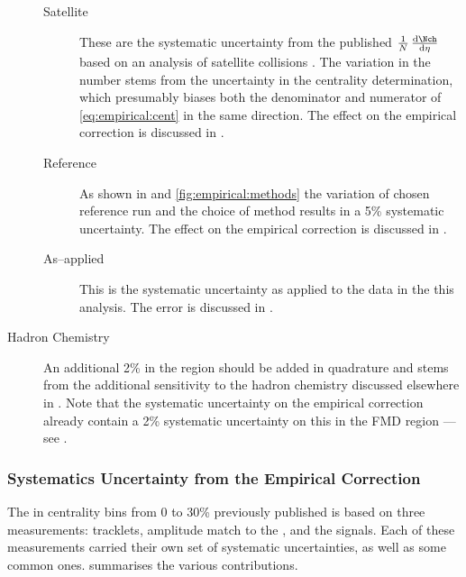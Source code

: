\begin{description}
  \begin{description}
  \item[Satellite] These are the systematic uncertainty from the
    published $\ndndeta$ based on an analysis of satellite collisions
    \cite{Abbas:2013bpa}.  The variation in the number stems from the
    uncertainty in the centrality determination, which presumably
    biases both the denominator and numerator of
    \eqref{eq:empirical:cent} in the same direction. The effect on the
    empirical correction is discussed in .
  \item[Reference] As shown in  and
    \ref{fig:empirical:methods} the variation of chosen reference run
    and the choice of method results in a 5\% systematic
    uncertainty. The effect on the empirical correction is discussed
    in .
  \item[As--applied] This is the systematic uncertainty as applied to
    the data in the this analysis. The error is discussed in
    .
  \end{description}
\item[Hadron Chemistry] An additional 2\% in the  region should
  be added in quadrature and stems from the additional sensitivity to
  the hadron chemistry discussed elsewhere in
  . Note that the systematic uncertainty on
  the empirical correction already contain a 2\% systematic
  uncertainty on this in the FMD region --- see
  .
\end{description}

\subsubsection{Systematics Uncertainty from the Empirical Correction}
\label{sec:dndeta:sys:emp}

The \ndndeta{} in centrality bins from 0 to 30\% previously published
\cite{Abbas:2013bpa} is based on three measurements: \SPD{} tracklets,
\VZERO{} amplitude match to the \SPD{}, and the \FMD{} signals.  Each
of these measurements carried their own set of systematic
uncertainties, as well as some common
ones.  summarises the various
contributions.

